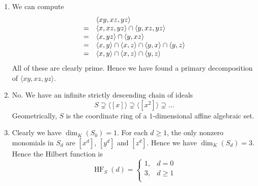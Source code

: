 \documentclass{article}
\newcommand\quotient[2]{{^{\displaystyle #1}}/{_{\displaystyle #2}}}
\begin{document}
\begin{enumerate}[style=nextline,label={Problem (\arabic*)}]
{\begin{enumerate}[label={(\alph*)}]
{\[
R \supseteq \langle a \rangle \supseteq \langle a^2 \rangle \supseteq \ldots
\]
This chain must eventually stabilize. Hence there is $n \in \mathbb{N}$ with $\langle a^n \rangle = \langle a^{n + 1} \rangle$. In particular, we have $a^n \in \langle a^{n + 1} \rangle$. This means that there is $b \in R$ with $a^n = b a^{n + 1}$, hence $0 = b a^{n + 1} - a^n = a^n \left( b a - 1 \right)$. Since $a \neq 0$ and $R$ is a domain, we must in fact have $0 = b a - 1$, hence $1 = b a$. Hence $a$ is a unit. Since every nonzero unit of $R$ is invertible, $R$ is a field.
\par
Now we will show that in an Artinian ring every prime ideal is maximal.
\par
Let $R$ be Artinian and $\mathfrak{p} \subseteq R$ be a prime ideal. Then $\quotient{R}{\mathfrak{p}}$ is an Artinian domain. By the first part, $\quotient{R}{\mathfrak{p}}$ is in fact a field. Hence $\mathfrak{p} \subseteq R$ is in fact a maximal ideal.
}
\item {
We can compute
\[
\begin{array}{>{\displaystyle}c>{\displaystyle}l}
& \langle xy, xz, yz \rangle \\
= & \langle x, xz, yz \rangle \cap \langle y, xz, yz \rangle \\
= & \langle x, yz \rangle \cap \langle y, xz \rangle \\
= & \langle x, y \rangle \cap \langle x, z \rangle \cap \langle y, x \rangle \cap \langle y, z \rangle \\
= & \langle x, y \rangle \cap \langle x, z \rangle \cap \langle y, z \rangle
\end{array}
\]
All of these are clearly prime. Hence we have found a primary decomposition of $\langle xy, xz, yz \rangle$.
}
\item {
No. We have an infinite strictly descending chain of ideals
\[
S \supsetneq \langle [x] \rangle \supsetneq \langle [x^2] \rangle \supsetneq \ldots
\]
Geometrically, $S$ is the coordinate ring of a $1$-dimensional affine algebraic set.
}
\item {
Clearly we have $\operatorname{dim}_K(S_0) = 1$. For each $d \geq 1$, the only nonzero monomials in $S_d$ are $[x^d]$, $[y^d]$ and $[z^d]$. Hence we have $\operatorname{dim}_K(S_d) = 3$. Hence the Hilbert function is
\[
\operatorname{HF}_S(d) = \begin{cases} 1, & d = 0 \\ 3, & d \geq 1 \\ \end{cases}
\]
}
\end{enumerate}}
\end{enumerate}
\end{document}
